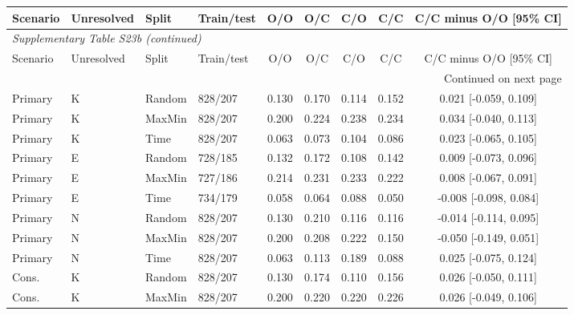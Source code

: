 \begin{longtable}{llllccccc}

\toprule Scenario & Unresolved & Split & Train/test & O/O & O/C & C/O & C/C & C/C minus O/O [95\% CI] \\ \midrule\endfirsthead

\multicolumn{9}{l}{\textit{Supplementary Table S23b (continued)}} \\

\toprule Scenario & Unresolved & Split & Train/test & O/O & O/C & C/O & C/C & C/C minus O/O [95\% CI] \\ \midrule\endhead

\midrule\multicolumn{9}{r}{Continued on next page}\\\endfoot\bottomrule\endlastfoot

Primary & K & Random & 828/207 & 0.130 & 0.170 & 0.114 & 0.152 & 0.021 [-0.059, 0.109] \\

Primary & K & MaxMin & 828/207 & 0.200 & 0.224 & 0.238 & 0.234 & 0.034 [-0.040, 0.113] \\

Primary & K & Time & 828/207 & 0.063 & 0.073 & 0.104 & 0.086 & 0.023 [-0.065, 0.105] \\

Primary & E & Random & 728/185 & 0.132 & 0.172 & 0.108 & 0.142 & 0.009 [-0.073, 0.096] \\

Primary & E & MaxMin & 727/186 & 0.214 & 0.231 & 0.233 & 0.222 & 0.008 [-0.067, 0.091] \\

Primary & E & Time & 734/179 & 0.058 & 0.064 & 0.088 & 0.050 & -0.008 [-0.098, 0.084] \\

Primary & N & Random & 828/207 & 0.130 & 0.210 & 0.116 & 0.116 & -0.014 [-0.114, 0.095] \\

Primary & N & MaxMin & 828/207 & 0.200 & 0.208 & 0.222 & 0.150 & -0.050 [-0.149, 0.051] \\

Primary & N & Time & 828/207 & 0.063 & 0.113 & 0.189 & 0.088 & 0.025 [-0.075, 0.124] \\

Cons. & K & Random & 828/207 & 0.130 & 0.174 & 0.110 & 0.156 & 0.026 [-0.050, 0.111] \\

Cons. & K & MaxMin & 828/207 & 0.200 & 0.220 & 0.220 & 0.226 & 0.026 [-0.049, 0.106] \\


\end{longtable}
